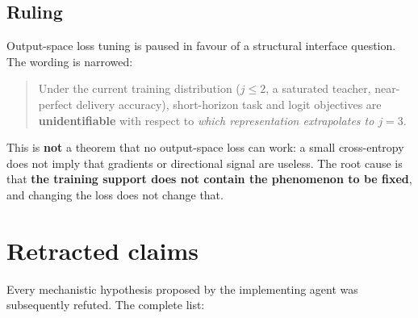 \documentclass[11pt, a4paper]{article}
\begin{document}
\subsection{Ruling}

Output-space loss tuning is paused in favour of a structural interface question. The
wording is narrowed:

\begin{quote}
Under the current training distribution ($j \le 2$, a saturated teacher, near-perfect
delivery accuracy), short-horizon task and logit objectives are \textbf{unidentifiable}
with respect to \emph{which representation extrapolates to $j{=}3$}.
\end{quote}

This is \textbf{not} a theorem that no output-space loss can work: a small cross-entropy
does not imply that gradients or directional signal are useless. The root cause is that
\textbf{the training support does not contain the phenomenon to be fixed}, and changing
the loss does not change that.

\section{Retracted claims}\label{sec:retract}

Every mechanistic hypothesis proposed by the implementing agent was subsequently refuted.
The complete list:
\end{document}
